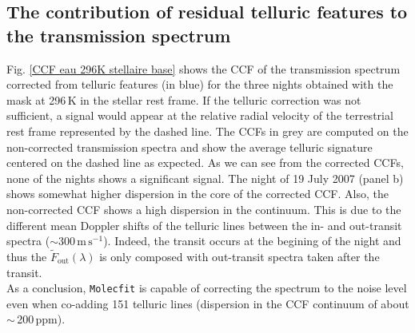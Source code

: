 \documentclass{aa}
\begin{document}
	\subsection{The contribution of residual telluric features to the transmission spectrum}
	\label{CCF water 296k}
\begin{figure*}[h]
\caption[CCF eau 296K stellaire base]{CCFs of the transmission spectrum corrected from the telluric features (blue) and non-corrected (grey) in the stellar rest frame using the water vapor mask at 296\,K for the three nights (panel (a) : 7 September 2006, (b) : 19 July 2007  and (c) : 28 August 2007). The dashed line shows the observer's radial velocity, where telluric residuals would be expected.}
\label{CCF eau 296K stellaire base}
\end{figure*}
Fig. \ref{CCF eau 296K stellaire base} shows the CCF of the transmission spectrum corrected from telluric features (in blue) for the three nights obtained with the mask at 296\,K in the stellar rest frame. If the telluric correction was not sufficient, a signal would appear at the relative radial velocity of the terrestrial rest frame represented by the dashed line. The CCFs in grey are computed on the non-corrected transmission spectra and show the average telluric signature centered on the dashed line as expected. As we can see from the corrected CCFs, none of the nights shows a significant signal. The night of 19 July 2007 (panel b) shows somewhat higher dispersion in the core of the corrected CCF. Also, the non-corrected CCF shows a high dispersion in the continuum. This is due to  the different mean Doppler shifts of the telluric lines between the in- and out-transit spectra ($\sim \mathrm{300\,m\,s^{-1}}$). Indeed, the transit occurs at the begining of the night and thus the $\tilde{F}_{\mathrm{out}}(\lambda)$ is only composed with out-transit spectra taken after the transit.\\
As a conclusion, \texttt{Molecfit}  is capable of correcting the spectrum to the noise level  even when co-adding 151 telluric lines (dispersion in the CCF continuum of about $\sim$\,200\,ppm).
\end{document}
